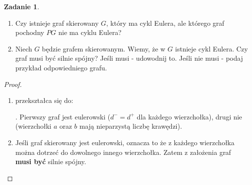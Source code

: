 \documentclass[11pt]{article}
\theoremstyle{definition}
\newtheorem{zadanie}{Zadanie}
\begin{document}
\begin{zadanie}
    \begin{enumerate}
        \item Czy istnieje graf skierowany $G$, który ma cykl Eulera, ale którego graf pochodny $PG$ nie ma cyklu Eulera?
        \item Niech $G$ będzie grafem skierowanym. Wiemy, że w $G$ istnieje cykl Eulera. Czy graf musi być silnie spójny? Jeśli musi - udowodnij to. Jeśli nie musi - podaj przykład odpowiedniego grafu.
    \end{enumerate}
\end{zadanie}
\begin{proof}
    \begin{enumerate}
        \item

               przekształca się do:
              . Pierwszy graf jest eulerowski ($d^- = d^+$ dla każdego wierzchołka), drugi nie (wierzchołki $a$ oraz $b$ mają nieparzystą liczbę krawędzi).

        \item Jeśli graf skierowany jest eulerowski, oznacza to że z każdego wierzchołka można dotrzeć do dowolnego innego wierzchołka. Zatem z założenia graf \textbf{musi być} silnie spójny.
    \end{enumerate}

\end{proof}
\end{document}
